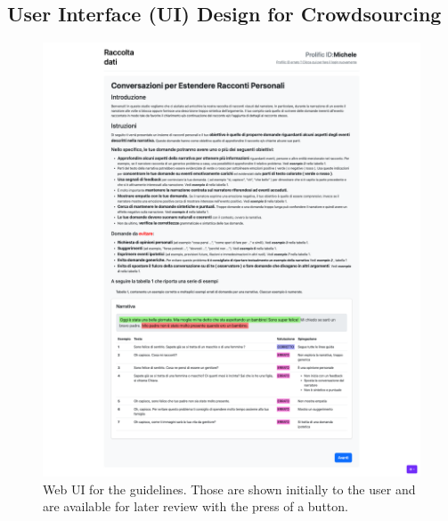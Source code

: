 \subsection{User Interface (UI) Design for Crowdsourcing}
\begin{figure}[!htbp]
    \centering
    \includegraphics[width=1\linewidth]{assets//imgs/UI-guidelines.png}
    \caption{Web UI for the guidelines. Those are shown initially to the user and are available for later review with the press of a button.}
    \label{fig:data_collection_web:1}
\end{figure}


